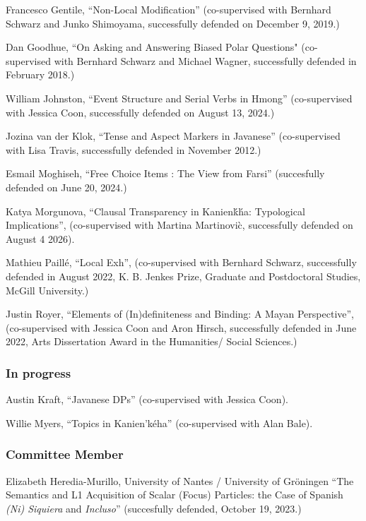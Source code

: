 \documentclass[11pt]{article}
\begin{document}
Francesco Gentile, ``Non-Local Modification'' (co-supervised with Bernhard Schwarz and Junko Shimoyama, successfully defended on December 9, 2019.)

Dan Goodhue, ``On Asking and Answering Biased Polar Questions" (co-supervised with Bernhard Schwarz and Michael Wagner, successfully defended in February 2018.)

William Johnston, ``Event Structure and Serial Verbs in Hmong'' (co-supervised with Jessica Coon, successfully defended on August 13, 2024.)

Jozina van der Klok, ``Tense and Aspect Markers in Javanese'' (co-supervised with Lisa Travis, successfully defended in November
2012.)
 
Esmail Moghiseh, ``Free Choice Items : The View from Farsi'' (succesfully defended on June 20, 2024.)

Katya Morgunova, ``Clausal Transparency in Kanien\'k\'ha: Typological Implications'', (co-supervised with Martina Martinovi\`c, successfully defended on August 4 2026).

Mathieu Paill\'e, ``Local Exh'', (co-supervised with Bernhard Schwarz, successfully defended in August 2022, K. B. Jenkes Prize, Graduate and Postdoctoral Studies, McGill University.)

Justin Royer, ``Elements of (In)definiteness and Binding: A Mayan Perspective'', (co-supervised with Jessica Coon and Aron Hirsch, successfully defended in June
2022, Arts Dissertation Award in the Humanities/ Social Sciences.)

\vspace{-10pt}

\subsubsection*{In progress}

Austin Kraft, ``Javanese DPs'' (co-supervised with Jessica Coon).

Willie Myers, ``Topics in Kanien'k\'eha'' (co-supervised with Alan Bale).


\vspace{-10pt}

\subsubsection*{Committee Member}

Elizabeth Heredia-Murillo, University of Nantes / University of Gr\"{o}ningen ``The Semantics and L1 Acquisition of Scalar (Focus) Particles: the Case of Spanish \textit{(Ni) Siquiera} and \textit{Incluso}'' (succesfully defended, October 19, 2023.)
\end{document}
